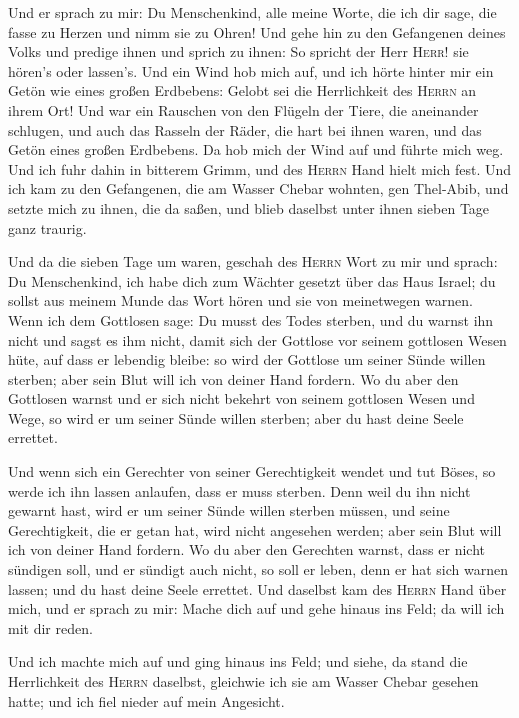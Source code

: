  Und er sprach zu mir: Du Menschenkind, alle meine Worte,
die ich dir sage, die fasse zu Herzen und nimm sie zu Ohren!
 Und gehe hin zu den Gefangenen deines Volks und predige
ihnen und sprich zu ihnen: So spricht der Herr \textsc{Herr}! sie
hören's oder lassen's.  Und ein Wind hob mich auf, und
ich hörte hinter mir ein Getön wie eines großen Erdbebens: Gelobt sei
die Herrlichkeit des \textsc{Herrn} an ihrem Ort!  Und
war ein Rauschen von den Flügeln der Tiere, die aneinander schlugen, und
auch das Rasseln der Räder, die hart bei ihnen waren, und das Getön
eines großen Erdbebens.  Da hob mich der Wind auf und
führte mich weg. Und ich fuhr dahin in bitterem Grimm, und des
\textsc{Herrn} Hand hielt mich fest.  Und ich kam zu den
Gefangenen, die am Wasser Chebar wohnten, gen Thel-Abib, und setzte mich
zu ihnen, die da saßen, und blieb daselbst unter ihnen sieben Tage ganz
traurig.

 Und da die sieben Tage um waren, geschah des
\textsc{Herrn} Wort zu mir und sprach:  Du Menschenkind,
ich habe dich zum Wächter gesetzt über das Haus Israel; du sollst aus
meinem Munde das Wort hören und sie von meinetwegen warnen.
 Wenn ich dem Gottlosen sage: Du musst des Todes sterben,
und du warnst ihn nicht und sagst es ihm nicht, damit sich der Gottlose
vor seinem gottlosen Wesen hüte, auf dass er lebendig bleibe: so wird
der Gottlose um seiner Sünde willen sterben; aber sein Blut will ich von
deiner Hand fordern.  Wo du aber den Gottlosen warnst und
er sich nicht bekehrt von seinem gottlosen Wesen und Wege, so wird er um
seiner Sünde willen sterben; aber du hast deine Seele errettet.

 Und wenn sich ein Gerechter von seiner Gerechtigkeit
wendet und tut Böses, so werde ich ihn lassen anlaufen, dass er muss
sterben. Denn weil du ihn nicht gewarnt hast, wird er um seiner Sünde
willen sterben müssen, und seine Gerechtigkeit, die er getan hat, wird
nicht angesehen werden; aber sein Blut will ich von deiner Hand fordern.
 Wo du aber den Gerechten warnst, dass er nicht sündigen
soll, und er sündigt auch nicht, so soll er leben, denn er hat sich
warnen lassen; und du hast deine Seele errettet.  Und
daselbst kam des \textsc{Herrn} Hand über mich, und er sprach zu mir:
Mache dich auf und gehe hinaus ins Feld; da will ich mit dir reden.

 Und ich machte mich auf und ging hinaus ins Feld; und
siehe, da stand die Herrlichkeit des \textsc{Herrn} daselbst, gleichwie
ich sie am Wasser Chebar gesehen hatte; und ich fiel nieder auf mein
Angesicht.

